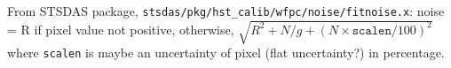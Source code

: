 From STSDAS package, \texttt{stsdas/pkg/hst\_calib/wfpc/noise/fitnoise.x}: noise = R if pixel value not positive, otherwise, $ \sqrt{R^2 + N/g + (N \times \texttt{scalen}/100)^2} $ where \texttt{scalen} is maybe an uncertainty of pixel (flat uncertainty?) in percentage.

%
%
%
%
%

